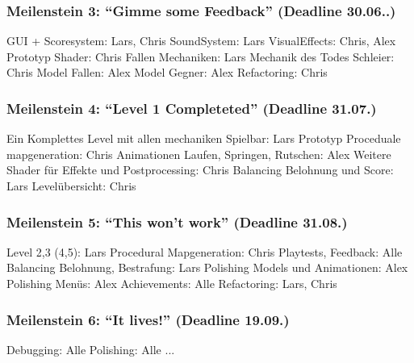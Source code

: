 \documentclass{article}
\begin{document}
\subsubsection{Meilenstein 3: “Gimme some Feedback” (Deadline 30.06..)}
GUI + Scoresystem: Lars, Chris\newline
SoundSystem: Lars\newline
VisualEffects: Chris, Alex\newline
Prototyp Shader: Chris\newline
Fallen Mechaniken: Lars\newline
Mechanik des Todes Schleier: Chris\newline
Model Fallen: Alex\newline
Model Gegner: Alex\newline
Refactoring: Chris\newline
\subsubsection{Meilenstein 4: “Level 1 Completeted” (Deadline 31.07.)}
Ein Komplettes Level mit allen mechaniken Spielbar: Lars\newline
Prototyp Proceduale mapgeneration: Chris\newline
Animationen Laufen, Springen, Rutschen: Alex\newline
Weitere Shader für Effekte und Postprocessing: Chris\newline
Balancing Belohnung und Score: Lars\newline
Levelübersicht: Chris\newline
\subsubsection{Meilenstein 5: “This won’t work” (Deadline 31.08.)}
Level 2,3 (4,5): Lars\newline
Procedural Mapgeneration: Chris\newline
Playtests, Feedback: Alle\newline
Balancing Belohnung, Bestrafung: Lars\newline
Polishing Models und Animationen: Alex\newline
Polishing Menüs: Alex\newline
Achievements: Alle\newline
Refactoring: Lars, Chris\newline
\subsubsection{Meilenstein 6: “It lives!” (Deadline 19.09.)}
Debugging: Alle\newline
Polishing: Alle\newline
...\newline

	
\end{document}
